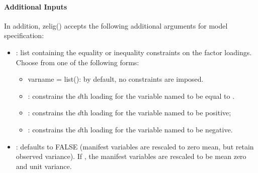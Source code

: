 \documentclass[letterpaper,10pt,english]{sphinxmanual}
\begin{document}
\paragraph{Additional Inputs}
\label{zelig-factorbayes:additional-inputs}
In addition, zelig() accepts the following additional arguments for
model specification:
\begin{itemize}
\item {} 
: list containing the equality or inequality
constraints on the factor loadings. Choose from one of the following
forms:
\begin{itemize}
\item {} 
varname = list(): by default, no constraints are imposed.

\item {} 
: constrains the \(d\)th loading for
the variable named  to be equal to .

\item {} 
: constrains the \(d\)th loading for
the variable named  to be positive;

\item {} 
: constrains the \(d\)th loading for
the variable named  to be negative.

\end{itemize}

\item {} 
: defaults to FALSE (manifest variables are rescaled to
zero mean, but retain observed variance). If , the manifest
variables are rescaled to be mean zero and unit variance.

\end{itemize}
\end{document}
